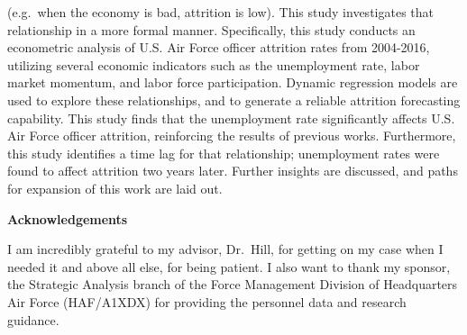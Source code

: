\documentclass[12pt,letterpaper,toc=flat,oneside]{report}
\theoremstyle{definition}
\theoremstyle{definition}
\theoremstyle{definition}
\theoremstyle{remark}
\begin{document}
(e.g.~when the economy is bad, attrition is low). This study
investigates that relationship in a more formal manner. Specifically,
this study conducts an econometric analysis of U.S. Air Force officer
attrition rates from 2004-2016, utilizing several economic indicators
such as the unemployment rate, labor market momentum, and labor force
participation. Dynamic regression models are used to explore these
relationships, and to generate a reliable attrition forecasting
capability. This study finds that the unemployment rate significantly
affects U.S. Air Force officer attrition, reinforcing the results of
previous works. Furthermore, this study identifies a time lag for that
relationship; unemployment rates were found to affect attrition two
years later. Further insights are discussed, and paths for expansion of
this work are laid out.
    \newpage
\thispagestyle{plain}
    \begin{center}
	\Large\bfseries Acknowledgements
    \end{center}
    \vspace{3em}
    I am incredibly grateful to my advisor, Dr.~Hill, for getting on my case
    when I needed it and above all else, for being patient. I also want to
    thank my sponsor, the Strategic Analysis branch of the Force Management
    Division of Headquarters Air Force (HAF/A1XDX) for providing the
    personnel data and research guidance.
 \newpage
\renewcommand\contentsname{\centering \Large Table of Contents}
\singlespace
\tableofcontents
\newpage
\renewcommand\listtablename{\centering \Large List of Tables}
\end{document}
